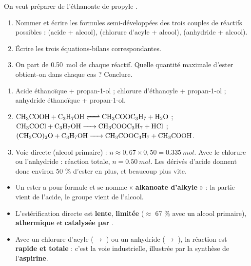 \documentclass[11pt]{article}
\begin{document}
\begin{exercice}
On veut préparer de l'éthanoate de propyle .
\begin{enumerate}
\item Nommer et écrire les formules semi-développées des trois couples de réactifs possibles : (acide + alcool), (chlorure d'acyle + alcool), (anhydride + alcool).
\item Écrire les trois équations-bilans correspondantes.
\item On part de \SI{0,50}{mol} de chaque réactif. Quelle quantité maximale d'ester obtient-on dans chaque cas ? Conclure.
\end{enumerate}
\end{exercice}

\begin{corrige}
\begin{enumerate}
\item Acide éthanoïque  + propan-1-ol  ; chlorure d'éthanoyle  + propan-1-ol ; anhydride éthanoïque  + propan-1-ol.
\item $\ce{CH3COOH + C3H7OH <=> CH3COOC3H7 + H2O}$ ; $\ce{CH3COCl + C3H7OH -> CH3COOC3H7 + HCl}$ ; $\ce{(CH3CO)2O + C3H7OH -> CH3COOC3H7 + CH3COOH}$.
\item Voie directe (alcool primaire) : $n \approx 0{,}67 \times 0{,}50 = \SI{0,335}{mol}$. Avec le chlorure ou l'anhydride : réaction totale, $n = \SI{0,50}{mol}$. Les dérivés d'acide donnent donc environ 50 \% d'ester en plus, et beaucoup plus vite.
\end{enumerate}
\end{corrige}

\begin{aretenir}
\begin{itemize}
\item Un ester a pour formule  et se nomme « \textbf{alkanoate d'alkyle} » : la partie  vient de l'acide, le groupe  vient de l'alcool.
\item L'estérification directe  est \textbf{lente}, \textbf{limitée} ($\approx$ 67 \% avec un alcool primaire), \textbf{athermique} et \textbf{catalysée par }.
\item Avec un chlorure d'acyle ($\to$ ) ou un anhydride ($\to$ ), la réaction est \textbf{rapide et totale} : c'est la voie industrielle, illustrée par la synthèse de l'\textbf{aspirine}.
\end{itemize}
\end{aretenir}
\end{document}
